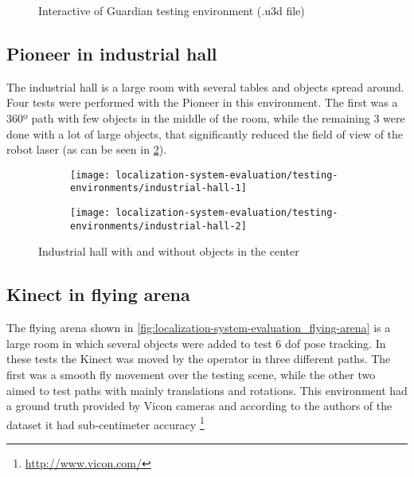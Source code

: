 \begin{figure}[H]
	\centering
	\caption{Interactive  of Guardian testing environment (.u3d file)}
	\label{fig:localization-system-evaluation_guardian-tests-environment-interactive}
\end{figure}



\subsection{Pioneer in industrial hall}

The industrial hall is a large room with several tables and objects spread around. Four tests were performed with the Pioneer in this environment. The first was a 360º path with few objects in the middle of the room, while the remaining 3 were done with a lot of large objects, that significantly reduced the field of view of the robot laser (as can be seen in \cref{fig:localization-system-evaluation_industrial-hall}).

\begin{figure}[H]
	\centering
	\begin{subfigure}[h]{.497\textwidth}
		\centering
		\texttt{[image: localization-system-evaluation/testing-environments/industrial-hall-1]}
	\end{subfigure}
	\begin{subfigure}[h]{.497\textwidth}
		\centering
		\texttt{[image: localization-system-evaluation/testing-environments/industrial-hall-2]}
	\end{subfigure}
	\caption{Industrial hall with and without objects in the center \cite{Sturm2012}}
	\label{fig:localization-system-evaluation_industrial-hall}
\end{figure}



\subsection{Kinect in flying arena}

The flying arena shown in \cref{fig:localization-system-evaluation_flying-arena} is a large room in which several objects were added to test 6 \gls{dof} pose tracking. In these tests the Kinect was moved by the operator in three different paths. The first was a smooth fly movement over the testing scene, while the other two aimed to test paths with mainly translations and rotations. This environment had a ground truth provided by Vicon cameras and according to the authors of the dataset \cite{Pomerleau2011} it had sub-centimeter accuracy \footnote{\url{http://www.vicon.com/}}

